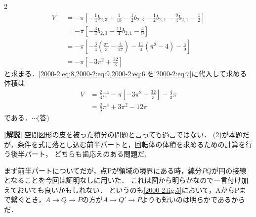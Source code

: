 \documentclass[../../main.tex]{subfiles}
\begin{document}
\begin{multicols}{2}
  \begin{align}
    V_{-}
     & = -\pi \left[ -\frac{1}{4}b_{2,3}+\frac{1}{18} - \frac{1}{2}b_{2,3} -\frac{1}{2}b_{2,1}-\frac{9}{4}b_{2,1}-\frac{1}{2} \right] \nonumber           \\
     & = -\pi \left[ -\frac{3}{4}b_{2,3} -\frac{11}{4}b_{2,1}-\frac{4}{9} \right]                                                     \nonumber           \\
     & = -\pi \left[ -\frac{3}{4}\left( \frac{\pi^2}{3} - \frac{4}{27}\right) -\frac{11}{4}\left(\pi^2-4\right)-\frac{4}{9} \right]   \nonumber           \\
     & = -\pi \left[ -3\pi^2 + \frac{32}{3}  \right]                                                                                  \label{2000-2:eq:6}
  \end{align}
  と求まる．\cref{2000-2:eq:8,2000-2:eq:9,2000-2:eq:6}を\cref{2000-2:eq:7}に代入して求める体積は
  \begin{align*}
    V
     & = \frac{2}{3}\pi^4 -\pi \left[ -3\pi^2 + \frac{32}{3}  \right] - \frac{4}{3}\pi \\
     & = \frac{2}{3}\pi^4 + 3\pi^2 -12 \pi
  \end{align*}
  である．$\cdots$(答)

  \vspace{10pt}
  {\bf[解説]}
  空間図形の皮を被った積分の問題と言っても過言ではない．
  (2)が本題だが，条件を式に落とし込む前半パートと，回転体の体積を求めるための計算を行う後半パート，
  どちらも歯応えのある問題だ．

  まず前半パートについてだが，点Pが領域の境界にある時，線分$PQ$が円の接線となることを今回は証明なしに用いた．
  これは図から明らかなので一言付け加えておいても良いかもしれない．
  というのも\cref{2000-2:fig:5}において，AからPまで繋ぐとき，$A\to Q\to P$の方が$A\to Q' \to P$よりも短いのは明らかであるからだ．

  \begin{figure}[H]
    \centering
\end{figure}
\end{multicols}
\end{document}
